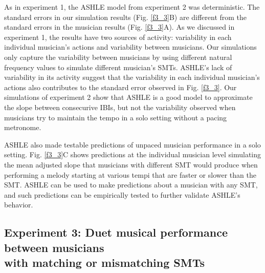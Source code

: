 \documentclass{report}
\begin{document}
As in experiment 1, the ASHLE model from experiment 2 was deterministic. The standard errors in our simulation results (Fig.{} \ref{f3_3}B) are different from the standard errors in the musician results (Fig.{} \ref{f3_3}A). As we discussed in experiment 1, the results have two sources of activity: variability in each individual musician's actions and variability between musicians. Our simulations only capture the variability between musicians by using different natural frequency values to simulate different musician's SMTs. ASHLE's lack of variability in its activity suggest that the variability in each individual musician's actions also contributes to the standard error observed in Fig.{} \ref{f3_3}. Our simulations of experiment 2 show that ASHLE is a good model to approximate the slope between consecurive IBIs, but not the variability observed when musicians try to maintain the tempo in a solo setting without a pacing metronome.

ASHLE also made testable predictions of unpaced musician performance in a solo setting. Fig.{} \ref{f3_3}C shows predictions at the individual musician level simulating the mean adjusted slope that musicians with different SMT would produce when performing a melody starting at various tempi that are faster or slower than the SMT. ASHLE can be used to make predictions about a musician with any SMT, and such predictions can be empirically tested to further validate ASHLE's behavior.

\subsection{Experiment 3: Duet musical performance between musicians \\ with matching or mismatching SMTs}
\end{document}
